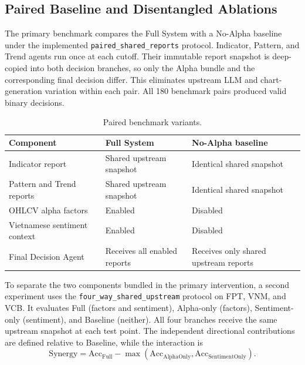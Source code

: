 \subsection{Paired Baseline and Disentangled Ablations}

The primary benchmark compares the Full System with a No-Alpha baseline under the implemented \texttt{paired\_shared\_reports} protocol. Indicator, Pattern, and Trend agents run once at each cutoff. Their immutable report snapshot is deep-copied into both decision branches, so only the Alpha bundle and the corresponding final decision differ. This eliminates upstream LLM and chart-generation variation within each pair. All 180 benchmark pairs produced valid binary decisions.

\begin{table}[H]
\centering
\caption{Paired benchmark variants.}
\label{tab:system_variants}
\renewcommand{\arraystretch}{1.2}
\begin{tabularx}{\textwidth}{|l|X|X|}
\hline
\textbf{Component} & \textbf{Full System} & \textbf{No-Alpha baseline} \\
\hline
Indicator report & Shared upstream snapshot & Identical shared snapshot \\
\hline
Pattern and Trend reports & Shared upstream snapshot & Identical shared snapshot \\
\hline
OHLCV alpha factors & Enabled & Disabled \\
\hline
Vietnamese sentiment context & Enabled & Disabled \\
\hline
Final Decision Agent & Receives all enabled reports & Receives only shared upstream reports \\
\hline
\end{tabularx}
\end{table}

To separate the two components bundled in the primary intervention, a second experiment uses the \texttt{four\_way\_shared\_upstream} protocol on FPT, VNM, and VCB. It evaluates Full (factors and sentiment), Alpha-only (factors), Sentiment-only (sentiment), and Baseline (neither). All four branches receive the same upstream snapshot at each test point. The independent directional contributions are defined relative to Baseline, while the interaction is
\begin{equation}
 \mathrm{Synergy}
 =\mathrm{Acc}_{\mathrm{Full}}
 -\max\!\left(\mathrm{Acc}_{\mathrm{AlphaOnly}},
               \mathrm{Acc}_{\mathrm{SentimentOnly}}\right).
 \label{eq:ablation_synergy}
\end{equation}


